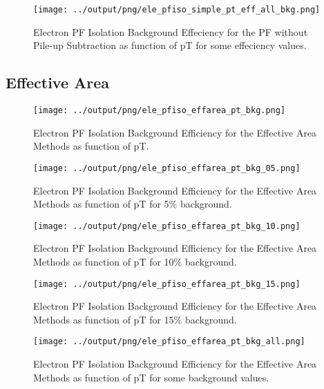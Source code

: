 \documentclass[11pt]{book}
\begin{document}
\begin{figure}[htb]
\centering
\texttt{[image: ../output/png/ele\_pfiso\_simple\_pt\_eff\_all\_bkg.png]}
\caption{Electron PF Isolation Background Effeciency for the PF without Pile-up Subtraction as function of pT for some effeciency values.}
\label{fig:ele_pfiso_pt_eff_simple_eff_all_bkg}
\end{figure}
\clearpage

\subsection{Effective Area}
\begin{figure}[htb]
\centering
\texttt{[image: ../output/png/ele\_pfiso\_effarea\_pt\_bkg.png]}
\caption{Electron PF Isolation Background Efficiency for the Effective Area Methods as function of pT.}
\label{fig:ele_pfiso_pt_bkg_effarea}
\end{figure}

\begin{figure}[htb]
\centering
\texttt{[image: ../output/png/ele\_pfiso\_effarea\_pt\_bkg\_05.png]}
\caption{Electron PF Isolation Background Efficiency for the Effective Area Methods as function of pT for 5\% background.}
\label{fig:ele_pfiso_pt_bkg_effarea_bkg_05}
\end{figure}

\begin{figure}[htb]
\centering
\texttt{[image: ../output/png/ele\_pfiso\_effarea\_pt\_bkg\_10.png]}
\caption{Electron PF Isolation Background Efficiency for the Effective Area Methods as function of pT for 10\% background.}
\label{fig:ele_pfiso_pt_bkg_effarea_bkg_10}
\end{figure}

\begin{figure}[htb]
\centering
\texttt{[image: ../output/png/ele\_pfiso\_effarea\_pt\_bkg\_15.png]}
\caption{Electron PF Isolation Background Efficiency for the Effective Area Methods as function of pT for 15\% background.}
\label{fig:ele_pfiso_pt_bkg_effarea_bkg_15}
\end{figure}

\begin{figure}[htb]
\centering
\texttt{[image: ../output/png/ele\_pfiso\_effarea\_pt\_bkg\_all.png]}
\caption{Electron PF Isolation Background Efficiency for the Effective Area Methods as function of pT for some background values.}
\label{fig:ele_pfiso_pt_bkg_effarea_bkg_all}
\end{figure}
\end{document}
